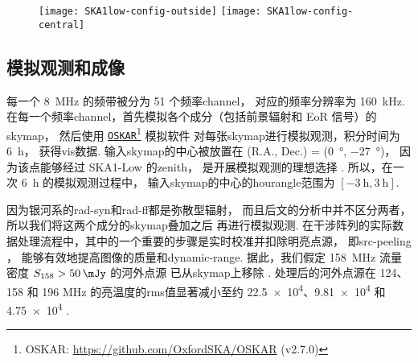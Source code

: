 \begin{figure}[htp]
  \centering
  \texttt{[image: SKA1low-config-outside]}%
  \hfill%
  \texttt{[image: SKA1low-config-central]}
  \label{fig:ska1low-config}
\end{figure}

\subsection{模拟观测和成像}

每一个 \SI{8}{\MHz} 的频带被分为 51 个频率\ac{channel}，
对应的频率分辨率为 \SI{160}{\kHz}.
在每一个频率\ac{channel}，首先模拟各个成分（包括前景辐射和 EoR 信号）的\ac{skymap}，
然后使用 \href{https://github.com/OxfordSKA/OSKAR}{\texttt{OSKAR}}\footnote{%
  OSKAR: \url{https://github.com/OxfordSKA/OSKAR} (v2.7.0)}
模拟软件\cite{mort2010}
对每张\ac{skymap}进行模拟观测，积分时间为 \SI{6}{\hour}，
获得\ac{vis}数据.
输入\ac{skymap}的中心被放置在
(R.A., Dec.\@) = (\SI{0}{\degree}, \SI{-27}{\degree})，
因为该点能够经过 SKA1-Low 的\ac{zenith}，
是开展模拟观测的理想选择 \cite{liu2009ps,datta2010}.
所以，在一次 \SI{6}{\hour} 的模拟观测过程中，
输入\ac{skymap}的中心的\ac{hourangle}范围为 $[\SI{-3}{\hour}, \SI{3}{\hour}]$.

因为银河系的\ac{rad-syn}和\ac{rad-ff}都是弥散型辐射，
而且后文的分析中并不区分两者，所以我们将这两个成分的\ac{skymap}叠加之后
再进行模拟观测.
在干涉阵列的实际数据处理流程中，其中的一个重要的步骤是实时校准并扣除明亮点源，
即\ac{src-peeling} \cite{noordam2004,mitchell2008,intema2009}，
能够有效地提高图像的质量和\ac{dynamic-range}.
据此，我们假定 \SI{158}{\MHz} 流量密度 $S_{158} > \SI{50}{\mJy}$ 的河外点源
已从\ac{skymap}上移除 \cite{liu2009ps,pindor2011,mort2017}.
处理后的河外点源在 124、158 和 196 \si{MHz} 的亮温度的\ac{rms}值显著减小至约
\num{22.5e4}、\num{9.81e4} 和 \num{4.75e4} \si{\mK}.

